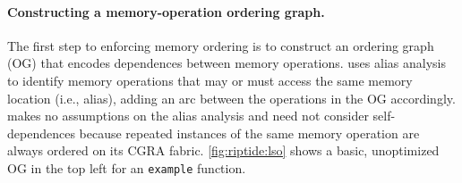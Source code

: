\paragraph{Constructing a memory-operation ordering graph.} 
The first step to enforcing memory ordering is to construct an ordering graph (OG) that encodes dependences between memory operations.
% 
\riptide uses alias analysis to identify memory operations
that may or must access the same memory location (i.e., alias), adding an arc between the operations in the OG accordingly.
%
\riptide makes no assumptions on the alias analysis and
%
%
need not consider self-dependences because repeated instances of the
same memory operation are always ordered on its CGRA fabric. %
%
\autoref{fig:riptide:lso} shows a basic, unoptimized OG in the top left for an 
{\tt example} function.

